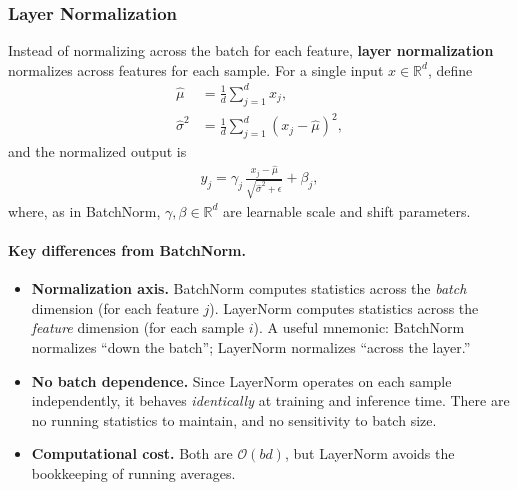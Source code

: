 \subsubsection{Layer Normalization}

Instead of normalizing across the batch for each feature, \textbf{layer normalization}~\cite{ba2016layer} normalizes across features for each sample.
For a single input $x \in \mathbb{R}^d$, define
\begin{align}
	\hat{\mu} &= \frac{1}{d} \sum_{j=1}^{d} x_j, \\[4pt]
	\hat{\sigma}^2 &= \frac{1}{d} \sum_{j=1}^{d} (x_j - \hat{\mu})^2,
\end{align}
and the normalized output is
\begin{align}
	y_j = \gamma_j \, \frac{x_j - \hat{\mu}}{\sqrt{\hat{\sigma}^2 + \epsilon}} + \beta_j,
\end{align}
where, as in BatchNorm, $\gamma, \beta \in \mathbb{R}^d$ are learnable scale and shift parameters.

\paragraph{Key differences from BatchNorm.}
\begin{itemize}
	\item \textbf{Normalization axis.} BatchNorm computes statistics across the \emph{batch} dimension (for each feature $j$). LayerNorm computes statistics across the \emph{feature} dimension (for each sample $i$).
	A useful mnemonic: BatchNorm normalizes ``down the batch''; LayerNorm normalizes ``across the layer.''
	\item \textbf{No batch dependence.} Since LayerNorm operates on each sample independently, it behaves \emph{identically} at training and inference time. There are no running statistics to maintain, and no sensitivity to batch size.
	\item \textbf{Computational cost.} Both are $\mathcal{O}(bd)$, but LayerNorm avoids the bookkeeping of running averages.
\end{itemize}

